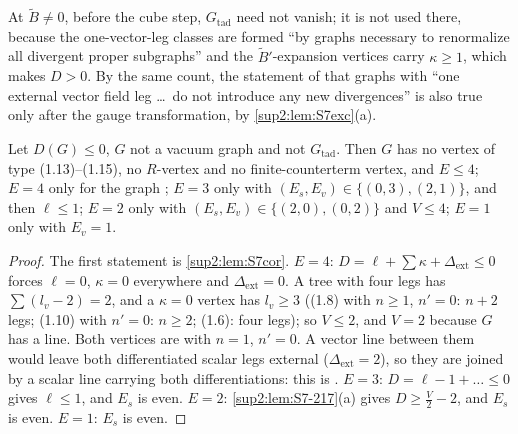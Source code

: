 At $\tilde B\ne0$, before the cube step, $G_{\mathrm{tad}}$ need not vanish; it is not used there, because the one-vector-leg classes are formed ``by graphs necessary to renormalize all divergent proper subgraphs'' \cite[p.~431]{Ba3} and the $\tilde B'$-expansion vertices carry $\kappa\ge1$, which makes $D>0$. By the same count, the statement of \cite[p.~431]{Ba3} that graphs with ``one external vector field leg \dots\ do not introduce any new divergences'' is also true only after the gauge transformation, by \cref{sup2:lem:S7exc}(a).

\begin{corollary}[the classification used in \cite{Ba3}, $d=3$]\label{sup2:cor:S7class}
Let $D(G)\le0$, $G$ not a vacuum graph and not $G_{\mathrm{tad}}$. Then $G$ has no vertex of type (1.13)--(1.15), no $R$-vertex and no finite-counterterm vertex, and $E\le4$; $E=4$ only for the graph \cite[(2.4)]{Ba3}; $E=3$ only with $(E_s,E_v)\in\{(0,3),(2,1)\}$, and then $\ell\le1$; $E=2$ only with $(E_s,E_v)\in\{(2,0),(0,2)\}$ and $V\le4$; $E=1$ only with $E_v=1$.
\end{corollary}

\begin{proof}
The first statement is \cref{sup2:lem:S7cor}. $E=4$: $D=\ell+\sum\kappa+\Delta_{\mathrm{ext}}\le0$ forces $\ell=0$, $\kappa=0$ everywhere and $\Delta_{\mathrm{ext}}=0$. A tree with four legs has $\sum(l_v-2)=2$, and a $\kappa=0$ vertex has $l_v\ge3$ ((1.8) with $n\ge1$, $n'=0$: $n+2$ legs; (1.10) with $n'=0$: $n\ge2$; (1.6): four legs); so $V\le2$, and $V=2$ because $G$ has a line. Both vertices are \cite[(1.8)]{Ba3} with $n=1$, $n'=0$. A vector line between them would leave both differentiated scalar legs external ($\Delta_{\mathrm{ext}}=2$), so they are joined by a scalar line carrying both differentiations: this is \cite[(2.4)]{Ba3}. $E=3$: $D=\ell-1+\dots\le0$ gives $\ell\le1$, and $E_s$ is even. $E=2$: \cref{sup2:lem:S7-217}(a) gives $D\ge\frac V2-2$, and $E_s$ is even. $E=1$: $E_s$ is even.
\end{proof}
